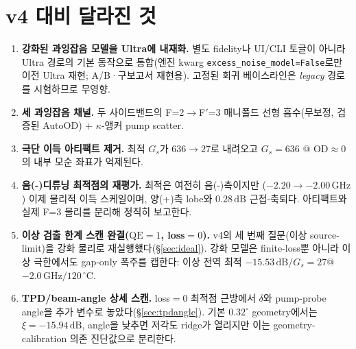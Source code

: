 \documentclass[11pt,a4paper]{article}
\newcommand{\dB}{\,\mathrm{dB}}
\newcommand{\GHz}{\,\mathrm{GHz}}
\newcommand{\degC}{\,^{\circ}\mathrm{C}}
\begin{document}
\tableofcontents
\bigskip

\section{v4 대비 달라진 것}
\begin{enumerate}[nosep]
\item \textbf{강화된 과잉잡음 모델을 Ultra에 내재화.} 별도 fidelity나 UI/CLI
      토글이 아니라 Ultra 경로의 기본 동작으로 통합(엔진 kwarg
      \texttt{excess\_noise\_model=False}로만 이전 Ultra 재현; A/B·구보고서 재현용).
      고정된 회귀 베이스라인은 \emph{legacy} 경로를 시험하므로 무영향.
\item \textbf{세 과잉잡음 채널.} 두 사이드밴드의 F=2$\to$F$'$=3 매니폴드 선형
      흡수(무보정, 검증된 AutoOD) + $\kappa$-앵커 pump scatter.
\item \textbf{극단 이득 아티팩트 제거.} 최적 $G_s$가 $636\to27$로 내려오고
      $G_s=636$ @ OD$\approx0$의 내부 모순 좌표가 억제된다.
\item \textbf{음(-)디튜닝 최적점의 재평가.} 최적은 여전히 음(-)측이지만
      ($-2.20\to-2.00\GHz$) 이제 물리적 이득 스케일이며, 양(+)측 lobe와
      $0.28\dB$ 근접-축퇴다. 아티팩트와 실제 F=3 물리를 분리해 정직히 보고한다.
\item \textbf{이상 검출 한계 스캔 완결($\mathrm{QE}=1$, loss$=0$).} v4의 세 번째
      질문(이상 source-limit)을 강화 물리로 재실행했다(\S\ref{sec:ideal}). 강화
      모델은 finite-loss뿐 아니라 이상 극한에서도 gap-only 폭주를 캡한다: 이상 전역
      최적 $-15.53\dB$/$G_s=27$@$-2.0\GHz/120\degC$.
\item \textbf{TPD/beam-angle 상세 스캔.} loss$=0$ 최적점 근방에서 $\delta$와
      pump-probe angle을 추가 변수로 놓았다(\S\ref{sec:tpdangle}). 기본
      $0.32^\circ$ geometry에서는 $\xi=-15.94\dB$, angle을 낮추면 저각도 ridge가
      열리지만 이는 geometry-calibration 의존 진단값으로 분리한다.
\end{enumerate}

\end{document}
